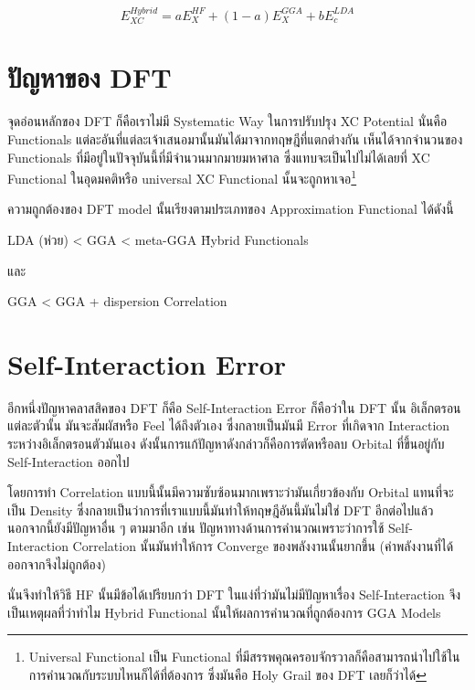 \begin{equation}
    E^{Hybrid}_{XC} = a E^{HF}_{X} + (1 - a) E^{GGA}_{X} + b E^{LDA}_{c}
\end{equation}

\section{ปัญหาของ DFT}

จุดอ่อนหลักของ DFT ก็คือเราไม่มี Systematic Way ในการปรับปรุง XC Potential นั่นคือ Functionals 
แต่ละอันที่แต่ละเจ้าเสนอมานั้นมันได้มาจากทฤษฎีที่แตกต่างกัน เห็นได้จากจำนวนของ Functionals 
ที่มีอยู่ในปัจจุบันนี้ที่มีจำนวนมากมายมหาศาล ซึ่งแทบจะเป็นไปไม่ได้เลยที่ XC Functional ในอุดมคติหรือ 
universal XC Functional นั้นจะถูกหาเจอ\footnote{Universal Functional เป็น Functional 
ที่มีสรรพคุณครอบจักรวาลก็คือสามารถนำไปใช้ในการคำนวณกับระบบไหนก็ได้ที่ต้องการ ซึ่งมันคือ Holy Grail 
ของ DFT เลยก็ว่าได้}

ความถูกต้องของ DFT model นั้นเรียงตามประเภทของ Approximation Functional ได้ดังนี้ 

LDA (ห่วย) < GGA < meta-GGA \~ Hybrid Functionals 

\noindent และ 

GGA < GGA + dispersion Correlation 

\section{Self-Interaction Error}

อีกหนึ่งปัญหาคลาสสิคของ DFT ก็คือ Self-Interaction Error ก็คือว่าใน DFT นั้น อิเล็กตรอนแต่ละตัวนั้น%
มันจะสัมผัสหรือ Feel ได้ถึงตัวเอง ซึ่งกลายเป็นมันมี Error ที่เกิดจาก Interaction ระหว่างอิเล็กตรอนตัวมันเอง 
ดังนั้นการแก้ปัญหาดังกล่าวก็คือการตัดหรือลบ Orbital ที่ขึ้นอยู่กับ Self-Interaction ออกไป 

โดยการทำ Correlation แบบนี้นั้นมีความซับซ้อนมากเพราะว่ามันเกี่ยวข้องกับ Orbital แทนที่จะเป็น Density 
ซึ่งกลายเป็นว่าการที่เราแบบนี้มันทำให้ทฤษฎีอันนี้มันไม่ใช่ DFT อีกต่อไปแล้ว นอกจากนี้ยังมีปัญหาอื่น ๆ ตามมาอีก เช่น 
ปัญหาทางด้านการคำนวณเพราะว่าการใช้ Self-Interaction Correlation นั้นมันทำให้การ Converge 
ของพลังงานนั้นยากขึ้น (ค่าพลังงานที่ได้ออกจากจึงไม่ถูกต้อง)

นั่นจึงทำให้วิธี HF นั้นมีข้อได้เปรียบกว่า DFT ในแง่ที่ว่ามันไม่มีปัญหาเรื่อง Self-Interaction จึงเป็นเหตุผลที่ว่าทำไม 
Hybrid Functional นั้นให้ผลการคำนวณที่ถูกต้องการ GGA Models 
